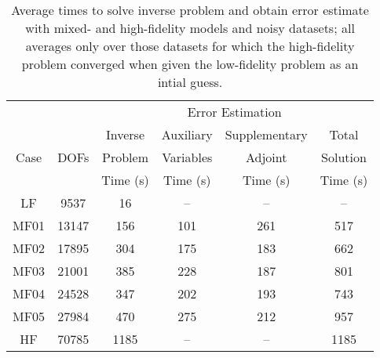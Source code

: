 %
%
%
%
%
%
%
%
%
%

\begin{table}
\caption{Average times to solve inverse problem and obtain error estimate with mixed- and high-fidelity models and noisy datasets; all averages only over those datasets for which the high-fidelity problem converged when given the low-fidelity problem as an intial guess.}
\centering
\begin{tabular}{ccc|c|c|c}
\cline{4-5} 
 & & & \multicolumn{2}{|c|}{Error Estimation} & \\
\cline{1-6}
\multicolumn{1}{|c|}{\multirow{3}{*}{Case}} & \multicolumn{1}{|c|}{\multirow{3}{*}{DOFs}} & Inverse & Auxiliary & Supplementary & \multicolumn{1}{|c|}{Total} \\
\multicolumn{1}{|c|}{} & \multicolumn{1}{|c|}{} & Problem & Variables & Adjoint & \multicolumn{1}{|c|}{Solution}\\
\multicolumn{1}{|c|}{} & \multicolumn{1}{|c|}{} & Time (s) &  Time (s) & Time (s) & \multicolumn{1}{|c|}{Time (s)}\\
\cline{1-6}
\multicolumn{1}{|c|}{LF}    & \multicolumn{1}{|c|}{9537}   & 16   & --  & -- & \multicolumn{1}{|c|}{--} \\ \hline
\multicolumn{1}{|c|}{MF01}  & \multicolumn{1}{|c|}{13147}  & 156  & 101 & 261 & \multicolumn{1}{|c|}{517} \\ \hline
\multicolumn{1}{|c|}{MF02}  & \multicolumn{1}{|c|}{17895}  & 304  & 175 & 183 & \multicolumn{1}{|c|}{662} \\ \hline
\multicolumn{1}{|c|}{MF03}  & \multicolumn{1}{|c|}{21001}  & 385  & 228 & 187 & \multicolumn{1}{|c|}{801} \\ \hline
\multicolumn{1}{|c|}{MF04}  & \multicolumn{1}{|c|}{24528}  & 347  & 202 & 193 & \multicolumn{1}{|c|}{743} \\ \hline
\multicolumn{1}{|c|}{MF05}  & \multicolumn{1}{|c|}{27984}  & 470  & 275 & 212 & \multicolumn{1}{|c|}{957} \\ \hline
\multicolumn{1}{|c|}{HF}    & \multicolumn{1}{|c|}{70785}  & 1185 & --  & --  & \multicolumn{1}{|c|}{1185} \\ \hline
\end{tabular}
\end{table}
%
